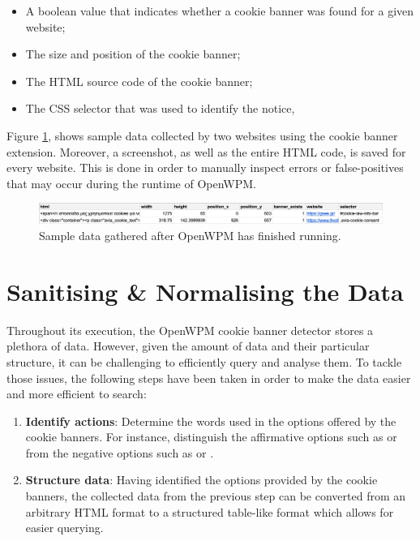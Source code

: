 \documentclass[../main.tex]{subfiles}
\begin{document}
\begin{itemize}
    \item A boolean value that indicates whether a cookie banner was found for a given website;
    \item The size and position of the cookie banner;
    \item The HTML source code of the cookie banner;
    \item The CSS selector that was used to identify the notice, 
\end{itemize}

Figure \ref{fig:impl_openwpm_sample_data}, shows sample data collected by two websites using the cookie banner extension. Moreover, a screenshot, as well as the entire HTML code, is saved for every website. This is done in order to manually inspect errors or false-positives that may occur during the runtime of OpenWPM.

\begin{figure}[ht]
    \centering
    \includegraphics[width=\textwidth]{images/implementation/open_wpm_out.png}
    \caption{Sample data gathered after OpenWPM has finished running.}
    \label{fig:impl_openwpm_sample_data}
\end{figure}

\section{Sanitising \& Normalising the Data}
Throughout its execution, the OpenWPM cookie banner detector stores a plethora of data. However, given the amount of data and their particular structure, it can be challenging to efficiently query and analyse them. To tackle those issues, the following steps have been taken in order to make the data easier and more efficient to search: 

\begin{enumerate}
    \item \textbf{Identify actions}: Determine the  words used in the options offered by the cookie banners. For instance, distinguish the affirmative options such as  or  from the negative options such as  or .
    
    \item \textbf{Structure data}: Having identified the options provided by the cookie banners, the collected data from the previous step can be converted from an arbitrary HTML format to a structured table-like format which allows for easier querying. 
\end{enumerate}
\end{document}
